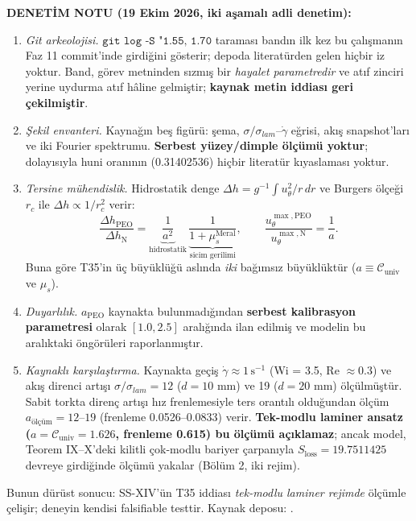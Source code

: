 \documentclass[12pt,a4paper]{article}
\begin{document}
\textbf{DENETİM NOTU (19 Ekim 2026, iki aşamalı adli denetim):}
\begin{enumerate}
    \item \textit{Git arkeolojisi.} $\texttt{git log -S "1.55, 1.70}$ taraması
    bandın ilk kez bu çalışmanın Faz 11 commit'inde girdiğini gösterir; depoda
    literatürden gelen hiçbir iz yoktur. Band, görev metninden sızmış bir
    \emph{hayalet parametredir} ve atıf zinciri yerine uydurma atıf hâline
    gelmiştir; \textbf{kaynak metin iddiası geri çekilmiştir}.
    \item \textit{Şekil envanteri.} Kaynağın beş figürü: şema,
    $\sigma/\sigma_{lam}$--$\dot\gamma$ eğrisi, akış snapshot'ları ve iki
    Fourier spektrumu. \textbf{Serbest yüzey/dimple ölçümü yoktur}; dolayısıyla
    huni oranının (0.31402536) hiçbir literatür kıyaslaması yoktur.
    \item \textit{Tersine mühendislik.} Hidrostatik denge
    $\Delta h = g^{-1}\int u_\theta^2/r\,dr$ ve Burgers ölçeği $r_c$ ile
    $\Delta h\propto 1/r_c^2$ verir:
    \begin{equation}
    \frac{\Delta h_{\mathrm{PEO}}}{\Delta h_{\mathrm{N}}}
    =\underbrace{\frac{1}{a^2}}_{\text{hidrostatik}}\,
    \underbrace{\frac{1}{1+\mu_s^{\mathrm{Meral}}}}_{\text{sicim gerilimi}},
    \qquad
    \frac{u_\theta^{\max,\mathrm{PEO}}}{u_\theta^{\max,\mathrm{N}}}=\frac{1}{a}.
    \end{equation}
    Buna göre T35'in üç büyüklüğü aslında \emph{iki} bağımsız büyüklüktür
    ($a\equiv\mathcal{C}_{\mathrm{univ}}$ ve $\mu_s$).
    \item \textit{Duyarlılık.} $a_{\mathrm{PEO}}$ kaynakta bulunmadığından
    \textbf{serbest kalibrasyon parametresi} olarak $[1.0,2.5]$ aralığında
    ilan edilmiş ve modelin bu aralıktaki öngörüleri raporlanmıştır.
    \item \textit{Kaynaklı karşılaştırma.} Kaynakta geçiş
    $\dot\gamma\approx 1\,\mathrm{s^{-1}}$ (Wi = 3.5, Re $\approx 0.3$) ve
    akış direnci artışı $\sigma/\sigma_{lam}=12$ ($d=10$ mm) ve 19
    ($d=20$ mm) ölçülmüştür. Sabit torkta direnç artışı hız frenlemesiyle
    ters orantılı olduğundan ölçüm $a_{\mathrm{ölçüm}}=12$--$19$
    (frenleme 0.0526--0.0833) verir. \textbf{Tek-modlu laminer ansatz
    ($a=\mathcal{C}_{\mathrm{univ}}=1.626$, frenleme 0.615) bu ölçümü
    açıklamaz}; ancak model, Teorem IX--X'deki kilitli çok-modlu bariyer
    çarpanıyla $S_{\mathrm{loss}}=19.7511425$ devreye girdiğinde ölçümü
    yakalar (Bölüm 2, iki rejim).
\end{enumerate}
Bunun dürüst sonucu: SS-XIV'ün T35 iddiası \emph{tek-modlu laminer rejimde}
ölçümle çelişir; deneyin kendisi falsifiable testtir. Kaynak deposu:
.
\end{document}
